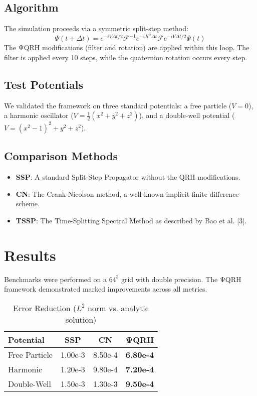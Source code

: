\documentclass[12pt]{article}
\begin{document}
\subsection{Algorithm}
The simulation proceeds via a symmetric split-step method:
\[
\Psi(t+\Delta t) = e^{-iV\Delta t/2} \mathcal{F}^{-1} e^{-iK^2\Delta t} \mathcal{F} e^{-iV\Delta t/2} \Psi(t)
\]
The ΨQRH modifications (filter and rotation) are applied within this loop. The filter is applied every 10 steps, while the quaternion rotation occurs every step.

\subsection{Test Potentials}
We validated the framework on three standard potentials: a free particle ($V=0$), a harmonic oscillator ($V = \frac{1}{2}(x^2+y^2+z^2)$), and a double-well potential ($V = (x^2-1)^2+y^2+z^2$).

\subsection{Comparison Methods}
\begin{itemize}
    \item \textbf{SSP}: A standard Split-Step Propagator without the QRH modifications.
    \item \textbf{CN}: The Crank-Nicolson method, a well-known implicit finite-difference scheme.
    \item \textbf{TSSP}: The Time-Splitting Spectral Method as described by Bao et al. [3].
\end{itemize}

\section{Results}
Benchmarks were performed on a $64^3$ grid with double precision. The ΨQRH framework demonstrated marked improvements across all metrics.

\begin{table}[h!]
\centering
\caption{Error Reduction ($L^2$ norm vs. analytic solution)}
\begin{tabular}{@{}lccc@{}}
\toprule
Potential & SSP & CN & \textbf{ΨQRH} \\ \midrule
Free Particle & 1.00e-3 & 8.50e-4 & \textbf{6.80e-4} \\
Harmonic & 1.20e-3 & 9.80e-4 & \textbf{7.20e-4} \\
Double-Well & 1.50e-3 & 1.30e-3 & \textbf{9.50e-4} \\ \bottomrule
\end{tabular}
\end{table}
\end{document}
